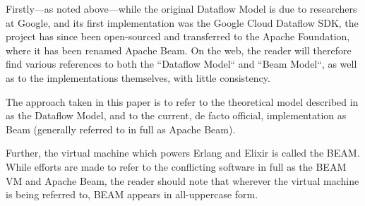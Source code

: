 Firstly---as noted above---while the original Dataflow Model is due to researchers at Google, and its first implementation was the Google Cloud Dataflow SDK, the project has since been open-sourced and transferred to the Apache Foundation, where it has been renamed Apache Beam.
On the web, the reader will therefore find various references to both the ``Dataflow Model`` and ``Beam Model``, as well as to the implementations themselves, with little consistency.

The approach taken in this paper is to refer to the theoretical model described in \cite{Akidau:2015} as the Dataflow Model, and to the current, de facto official, implementation \cite{ApacheBeam} as Beam (generally referred to in full as Apache Beam).

Further, the virtual machine which powers Erlang and Elixir is called the BEAM.
While efforts are made to refer to the conflicting software in full as the BEAM VM and Apache Beam, the reader should note that wherever the virtual machine is being referred to, BEAM appears in all-uppercase form.

